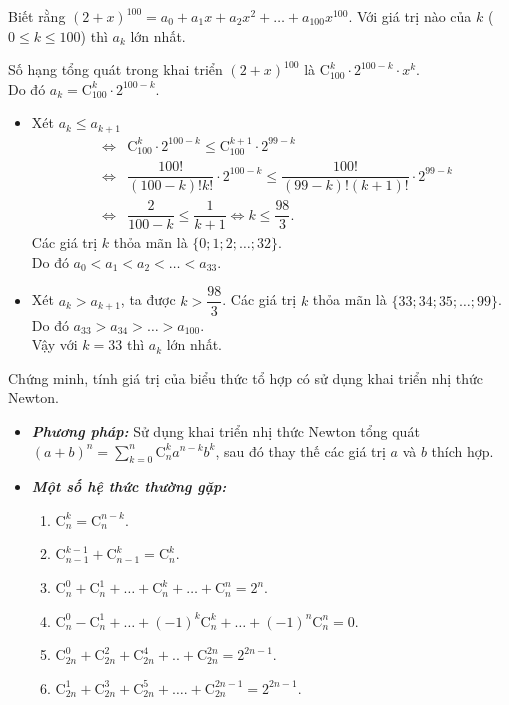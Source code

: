 \begin{bt}%
%
Biết rằng $(2+x)^{100}=a_0+a_1x+a_2x^2+\ldots+a_{100}x^{100}$. Với giá trị nào của $k$ ($0\le k\le 100$) thì $a_k$ lớn nhất.
\loigiai
{
Số hạng tổng quát trong khai triển $(2+x)^{100}$ là $\mathrm{C}_{100}^k\cdot 2^{100-k}\cdot x^k$.\\
Do đó $a_k=\mathrm{C}_{100}^k\cdot 2^{100-k}$.
\begin{itemize}
\item Xét $a_k\le a_{k+1}$
\begin{eqnarray*}
& \Leftrightarrow & \mathrm{C}_{100}^k\cdot 2^{100-k}\le \mathrm{C}_{100}^{k+1}\cdot 2^{99-k}\\
& \Leftrightarrow & \dfrac{100!}{(100-k)!k!}\cdot 2^{100-k}\le \dfrac{100!}{(99-k)!(k+1)!}\cdot 2^{99-k}\\
& \Leftrightarrow & \dfrac{2}{100-k}\le \dfrac{1}{k+1}\Leftrightarrow k\le \dfrac{98}{3}.
\end{eqnarray*}
Các giá trị $k$ thỏa mãn là $\{0;1;2;\ldots;32\}$.\\
Do đó $a_0<a_1<a_2<\ldots<a_{33}$.
\item Xét $a_k> a_{k+1}$, ta được $k> \dfrac{98}{3}$.
Các giá trị $k$ thỏa mãn là $\{33;34;35;\ldots;99\}$.\\
Do đó $a_{33}>a_{34}>\ldots>a_{100}$.\\
Vậy với $k=33$ thì $a_k$ lớn nhất.

\end{itemize}
}
\end{bt}
\begin{dang}{Chứng minh, tính giá trị của biểu thức tổ hợp có sử dụng khai triển nhị thức Newton.}
	\begin{itemize}
		\item \textbf{\textit{Phương pháp:}} Sử dụng khai triển nhị thức Newton tổng quát $\left(a+b\right)^n=
		\displaystyle\sum\limits_{k=0}^{n}{\mathrm{C}_n^ka^{n-k}b^k}$, sau đó thay thế các giá trị $a$ và $b$ thích hợp.
		\item \textbf{\textit{Một số hệ thức thường gặp:}}
		\begin{enumerate}
			\item $\mathrm{C}_n^k=\mathrm{C}_n^{n-k}$.
			\item $\mathrm{C}_{n-1}^{k-1}+\mathrm{C}_{n-1}^{k}=\mathrm{C}_n^k$.
			\item $\mathrm{C}_n^0+\mathrm{C}_n^1+\ldots +\mathrm{C}_n^k+\ldots +\mathrm{C}_n^n=2^n$. 
			\item $\mathrm{C}_n^0-\mathrm{C}_n^1+\ldots +(-1)^k\mathrm{C}_n^k+\ldots +(-1)^n\mathrm{C}_n^n=0$.
			\item $\mathrm{C}_{2n}^0+\mathrm{C}_{2n}^2+\mathrm{C}_{2n}^4+..+\mathrm{C}_{2n}^{2n}=2^{2n-1}$.
			\item $\mathrm{C}_{2n}^1+\mathrm{C}_{2n}^3+\mathrm{C}_{2n}^5+\ldots .+\mathrm{C}_{2n}^{2n-1}=2^{2n-1}$.
		\end{enumerate}
	\end{itemize}
\end{dang}

